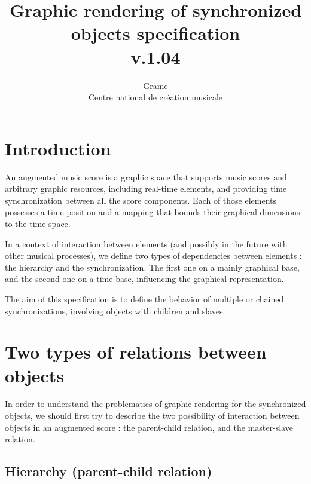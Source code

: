 \documentclass[a4paper]{article}
\begin{document}
\title{Graphic rendering of synchronized objects specification \\ v.1.04}


\author{Grame \\ Centre national de cr\'eation musicale}

\maketitle

\section{Introduction}\label{sec:intro}

An augmented music score is a graphic space that supports music scores and arbitrary graphic resources, including real-time elements, and providing time synchronization between all the score components. Each of those elements possesses a time position and a mapping that bounds their graphical dimensions to the time space.

In a context of interaction between elements (and possibly in the future with other musical processes), we define two types of dependencies between elements : the hierarchy and the synchronization. The first one on a mainly graphical base, and the second one on a time base, influencing the graphical representation.

The aim of this specification is to define the behavior of multiple or chained synchronizations, involving objects with children and slaves.

\section{Two types of relations between objects}\label{sec:relations}

In order to understand the problematics of graphic rendering for the synchronized objects, we should first try to describe the two possibility of interaction between objects in an augmented score : the parent-child relation, and the master-slave relation. 

\subsection{Hierarchy (parent-child relation)}\label{subsec:hierarchy}
\end{document}
